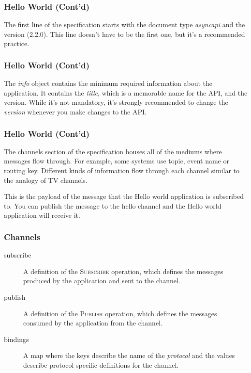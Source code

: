 \documentclass{efd-lecture}
\begin{document}
\begin{frame}[fragile]
  \frametitle{Hello World (Cont'd)}
  \begin{block}{}
    The first line of the specification starts with the document type \textit{\color{YellowOrange} asyncapi} and the version (2.2.0).
    This line doesn't have to be the first one,
    but it's a recommended practice.
  \end{block}
\end{frame}

\begin{frame}[fragile]
  \frametitle{Hello World (Cont'd)}
  \begin{block}{}
    The \textit{\color{YellowOrange} info} object contains the minimum required information about the application.
    It contains the \textit{\color{YellowGreen} title}, which is a memorable name for the API, and the version. While it's not mandatory,
    it's strongly recommended to change the \textit{\color{YellowGreen} version} whenever you make changes to the API\@.
  \end{block}
\end{frame}

\begin{frame}[fragile]
  \frametitle{Hello World (Cont'd)}
  \begin{block}{}
    The channels section of the specification houses all of the mediums where messages flow through. For example,
    some systems use topic, event name or routing key.
    Different kinds of information flow through each channel similar to the analogy of TV channels.
  \end{block}
\end{frame}

\begin{frame}
  \begin{block}{}
    This is the payload of the message that the Hello world application is subscribed to.
    You can publish the message to the hello channel and the Hello world application will receive it.
  \end{block}
\end{frame}

\begin{frame}
  \frametitle{Channels}
  \begin{description}
    \item[subscribe] A definition of the \textsc{\color{YellowOrange}Subscribe} operation, which defines the messages produced by the application and sent to the channel.
    \item[publish] A definition of the \textsc{\color{LimeGreen}Publish} operation, which defines the messages consumed by the application from the channel.
    \item[bindings] A map where the keys describe the name of the \textit{protocol} and the values describe protocol-specific definitions for the channel.
  \end{description}
\end{frame}
\end{document}

